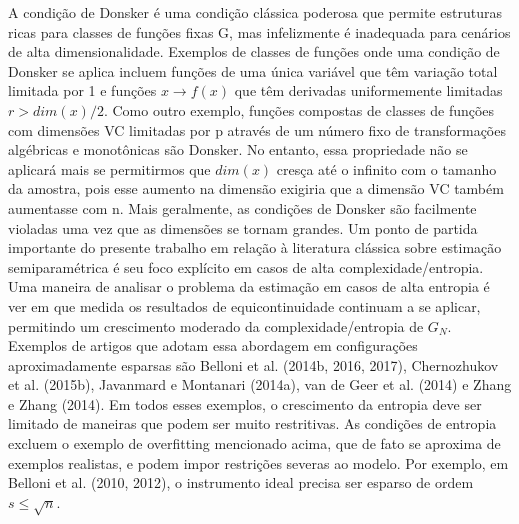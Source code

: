 \documentclass[a4paper,12pt]{article}[abntex2]
\begin{document}
A condição de Donsker é uma condição clássica poderosa que permite estruturas ricas para classes de funções fixas G, mas infelizmente é inadequada para cenários de alta dimensionalidade. Exemplos de classes de funções onde uma condição de Donsker se aplica incluem funções de uma única variável que têm variação total limitada por 1 e funções $x \rightarrow f(x)$ que têm derivadas uniformemente limitadas $r > dim(x)/2$. Como outro exemplo, funções compostas de classes de funções com dimensões VC limitadas por p através de um número fixo de transformações algébricas e monotônicas são Donsker. No entanto, essa propriedade não se aplicará mais se permitirmos que $dim(x)$ cresça até o infinito com o tamanho da amostra, pois esse aumento na dimensão exigiria que a dimensão VC também aumentasse com n. Mais geralmente, as condições de Donsker são facilmente violadas uma vez que as dimensões se tornam grandes. Um ponto de partida importante do presente trabalho em relação à literatura clássica sobre estimação semiparamétrica é seu foco explícito em casos de alta complexidade/entropia. Uma maneira de analisar o problema da estimação em casos de alta entropia é ver em que medida os resultados de equicontinuidade continuam a se aplicar, permitindo um crescimento moderado da complexidade/entropia de \(G_N\). Exemplos de artigos que adotam essa abordagem em configurações aproximadamente esparsas são Belloni et al. (2014b, 2016, 2017), Chernozhukov et al. (2015b), Javanmard e Montanari (2014a), van de Geer et al. (2014) e Zhang e Zhang (2014). Em todos esses exemplos, o crescimento da entropia deve ser limitado de maneiras que podem ser muito restritivas. As condições de entropia excluem o exemplo de overfitting mencionado acima, que de fato se aproxima de exemplos realistas, e podem impor restrições severas ao modelo. Por exemplo, em Belloni et al. (2010, 2012), o instrumento ideal precisa ser esparso de ordem $s \leq \sqrt{n}$.
\end{document}
